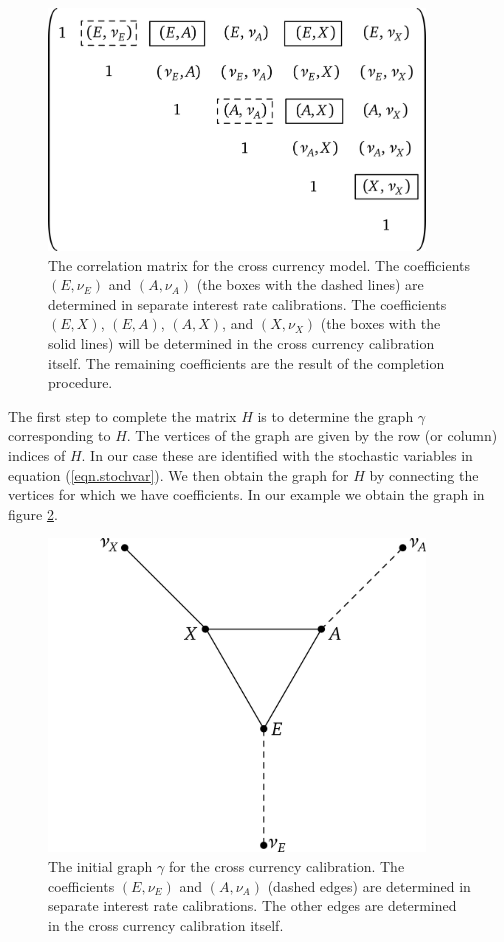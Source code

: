 \documentclass[11pt, a4paper]{article}
\begin{document}
\begin{figure}[hbt]
  \begin{center}
  	\includegraphics[width=10cm]{img/xccymodel.png}
  \end{center}
  \caption{The correlation matrix for the cross currency model. The coefficients $(E, \nu_E)$ and $(A, \nu_A)$ (the boxes with the dashed lines) are determined in separate interest rate calibrations. The coefficients $(E, X)$, $(E, A)$, $(A, X)$, and $(X, \nu_X)$ (the boxes with the solid lines) will be determined in the cross currency calibration itself. The remaining coefficients are the result of the completion procedure.}\label{fig.xccymodel}
\end{figure}

The first step to complete the matrix $H$ is to determine the graph $\gamma$ corresponding to $H$. The vertices of the graph are given by the row (or column) indices of $H$. In our case these are identified with the stochastic variables in equation (\ref{eqn.stochvar}). We then obtain the graph for $H$ by connecting the vertices for which we have coefficients. In our example we obtain the graph in figure \ref{fig.fxCalibrationGraph}.

\begin{figure}[hbt]
  \begin{center}
  	\includegraphics[width=10cm]{img/fxCalibrationGraph.png}
  \end{center}
  \caption{The initial graph $\gamma$ for the cross currency calibration. The coefficients $(E,\nu_E)$ and $(A,\nu_A)$ (dashed edges) are determined in separate interest rate calibrations. The other edges are determined in the cross currency calibration itself.}\label{fig.fxCalibrationGraph}
\end{figure}
\end{document}
